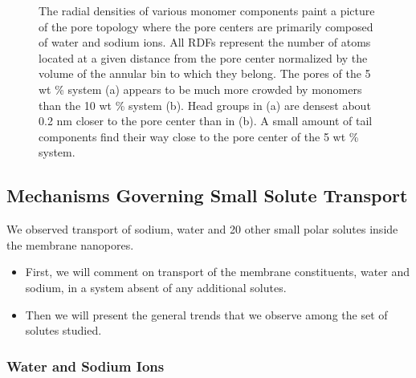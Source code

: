 \documentclass{article}
\begin{document}
\begin{figure}[!htb]
  \caption{The radial densities of various monomer components paint a picture of the
  pore topology where the pore centers are primarily composed of water and sodium ions.
  All RDFs represent the number of atoms located at a given distance from the pore center
  normalized by the volume of the annular bin to which they belong. The pores of the 5 
  wt \% system (a) appears to be much more crowded by monomers than the 10 wt \% system (b).
  Head groups in (a) are densest about 0.2 nm closer to the pore center than in (b). 
  A small amount of tail components find their way close to the pore center of the 5 wt \% system.
  }\label{fig:component_densities}
  \end{figure}

  \subsection*{Mechanisms Governing Small Solute Transport}\label{section:mechanism_overview}

  We observed transport of sodium, water and 20 other small polar solutes inside the
  membrane nanopores. 
  \begin{itemize}
  	\item First, we will comment on transport of the membrane constituents, water and sodium,
  	in a system absent of any additional solutes.
    \item Then we will present the general trends that we observe among the set of 
    solutes studied.
  \end{itemize}
  
  \subsubsection*{Water and Sodium Ions}\label{section:transport_water_sodium}
\end{document}
